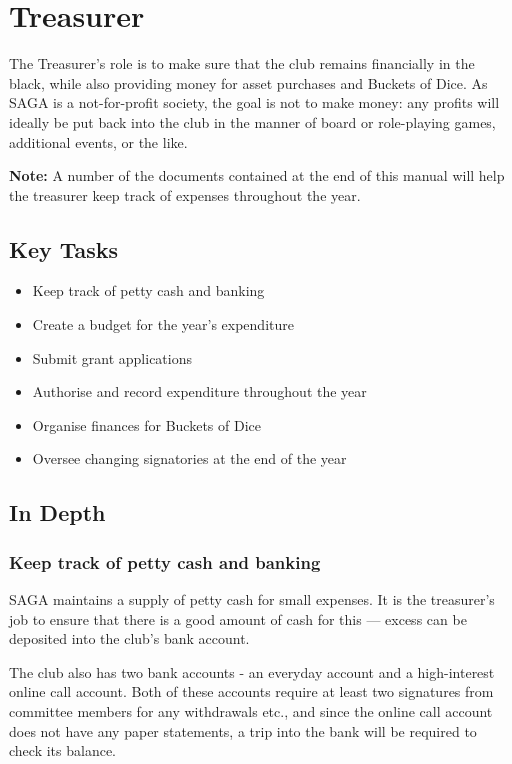 \section{Treasurer}
\label{sec:treasurer}

The Treasurer's role is to make sure that the club remains financially in the black, while also providing money for asset purchases and Buckets of Dice. As SAGA is a not-for-profit society, the goal is not to make money: any profits will ideally be put back into the club in the manner of board or role-playing games, additional events, or the like.

\textbf{Note:} A number of the documents contained at the end of this manual will help the treasurer keep track of expenses throughout the year.

\subsection{Key Tasks}

\begin{itemize}
  \item Keep track of petty cash and banking
  \item Create a budget for the year's expenditure
  \item Submit grant applications
  \item Authorise and record expenditure throughout the year
  \item Organise finances for Buckets of Dice
  \item Oversee changing signatories at the end of the year
\end{itemize}

\subsection{In Depth}

\subsubsection{Keep track of petty cash and banking}

SAGA maintains a supply of petty cash for small expenses. It is the treasurer's job to ensure that there is a good amount of cash for this --- excess can be deposited into the club's bank account.

The club also has two bank accounts - an everyday account and a high-interest online call account. Both of these accounts require at least two signatures from committee members for any withdrawals etc., and since the online call account does not have any paper statements, a trip into the bank will be required to check its balance.

